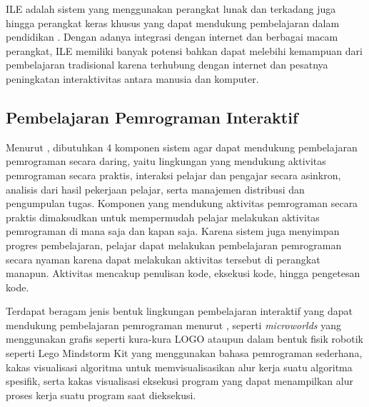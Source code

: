 
ILE adalah sistem yang menggunakan perangkat lunak dan terkadang juga hingga perangkat keras khusus yang dapat mendukung pembelajaran dalam pendidikan \parencite{psotka2012ile}. Dengan adanya integrasi dengan internet dan berbagai macam perangkat, ILE memiliki banyak potensi bahkan dapat melebihi kemampuan dari pembelajaran tradisional karena terhubung dengan internet dan pesatnya peningkatan interaktivitas antara manusia dan komputer.

\subsection{Pembelajaran Pemrograman Interaktif}
Menurut \textcite{choy2004interactive}, dibutuhkan 4 komponen sistem agar dapat mendukung pembelajaran pemrograman secara daring, yaitu lingkungan yang mendukung aktivitas pemrograman secara praktis, interaksi pelajar dan pengajar secara asinkron, analisis dari hasil pekerjaan pelajar, serta manajemen distribusi dan pengumpulan tugas. Komponen yang mendukung aktivitas pemrograman secara praktis dimaksudkan untuk mempermudah pelajar melakukan aktivitas pemrograman di mana saja dan kapan saja. Karena sistem juga menyimpan progres pembelajaran, pelajar dapat melakukan pembelajaran pemrograman secara nyaman karena dapat melakukan aktivitas tersebut di perangkat manapun. Aktivitas mencakup penulisan kode, eksekusi kode, hingga pengetesan kode.

Terdapat beragam jenis bentuk lingkungan pembelajaran interaktif yang dapat mendukung pembelajaran pemrograman menurut \textcite{moons2013pilot}, seperti \textit{microworlds} yang menggunakan grafis seperti kura-kura LOGO ataupun dalam bentuk fisik robotik seperti Lego Mindstorm Kit yang menggunakan bahasa pemrograman sederhana, kakas visualisasi algoritma untuk memvisualisasikan alur kerja suatu algoritma spesifik, serta kakas visualisasi eksekusi program yang dapat menampilkan alur proses kerja suatu program saat dieksekusi.

